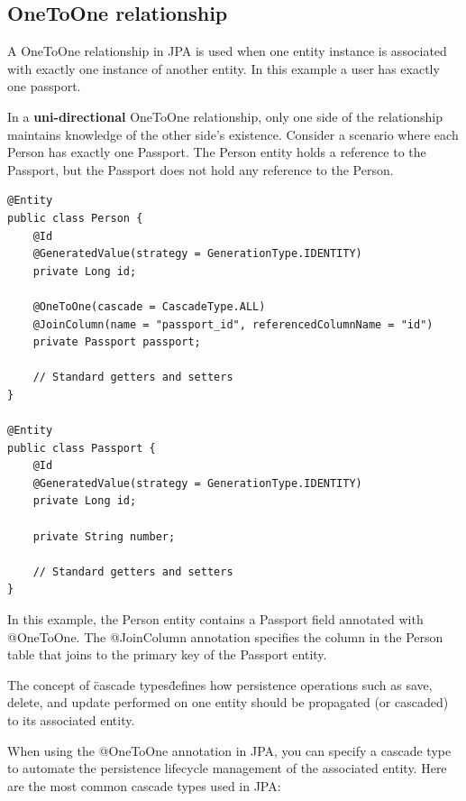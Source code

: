 \subsection{OneToOne relationship}

A OneToOne relationship in JPA is used when one entity instance is associated with exactly one instance of another entity.  In this example a user has exactly one passport.

In a \textbf{uni-directional} OneToOne relationship, only one side of the relationship maintains knowledge of the other side’s existence. Consider a scenario where each Person has exactly one Passport. The Person entity holds a reference to the Passport, but the Passport does not hold any reference to the Person.

\begin{lstlisting}
@Entity
public class Person {
    @Id
    @GeneratedValue(strategy = GenerationType.IDENTITY)
    private Long id;
    
    @OneToOne(cascade = CascadeType.ALL)
    @JoinColumn(name = "passport_id", referencedColumnName = "id")
    private Passport passport;

    // Standard getters and setters
}

@Entity
public class Passport {
    @Id
    @GeneratedValue(strategy = GenerationType.IDENTITY)
    private Long id;
    
    private String number;

    // Standard getters and setters
}
\end{lstlisting}

In this example, the Person entity contains a Passport field annotated with @OneToOne. The @JoinColumn annotation specifies the column in the Person table that joins to the primary key of the Passport entity.

The concept of \"cascade types\" defines how persistence operations such as save, delete, and update performed on one entity should be propagated (or cascaded) to its associated entity. 

When using the @OneToOne annotation in JPA, you can specify a cascade type to automate the persistence lifecycle management of the associated entity. Here are the most common cascade types used in JPA:

